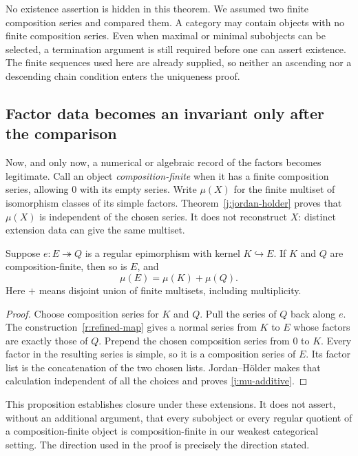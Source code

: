 No existence assertion is hidden in this theorem.  We assumed two finite
composition series and compared them.  A category may contain objects
with no finite composition series.  Even when maximal or minimal
subobjects can be selected, a termination argument is still required
before one can assert existence.  The finite sequences used here are
already supplied, so neither an ascending nor a descending chain
condition enters the uniqueness proof.

\subsection{Factor data becomes an invariant only after the comparison}

Now, and only now, a numerical or algebraic record of the factors becomes
legitimate.  Call an object \emph{composition-finite} when it has a finite
composition series, allowing $0$ with its empty series.  Write $\mu(X)$
for the finite multiset of isomorphism classes of its simple factors.
Theorem~\ref{j:jordan-holder} proves that $\mu(X)$ is independent of the
chosen series.  It does not reconstruct $X$: distinct extension data can
give the same multiset.

\begin{proposition}
\label{j:extension-additivity}
\label{j:splicing}
Suppose $e:E\twoheadrightarrow Q$ is a regular epimorphism with kernel
$K\hookrightarrow E$.  If $K$ and $Q$ are composition-finite, then so is
$E$, and
\begin{equation}
\label{j:mu-additive}
                         \mu(E)=\mu(K)+\mu(Q).
\end{equation}
Here $+$ means disjoint union of finite multisets, including multiplicity.
\end{proposition}

\begin{proof}
Choose composition series for $K$ and $Q$.  Pull the series of $Q$ back
along $e$.  The construction~\eqref{r:refined-map} gives a normal series
from $K$ to $E$ whose factors are exactly those of $Q$.  Prepend the
chosen composition series from $0$ to $K$.  Every factor in the resulting
series is simple, so it is a composition series of $E$.  Its factor list
is the concatenation of the two chosen lists.  Jordan--H\"older makes
that calculation independent of all the choices and proves
\eqref{j:mu-additive}.
\end{proof}

This proposition establishes closure under these extensions.  It does
not assert, without an additional argument, that every subobject or every
regular quotient of a composition-finite object is composition-finite in
our weakest categorical setting.  The direction used in the proof is
precisely the direction stated.


